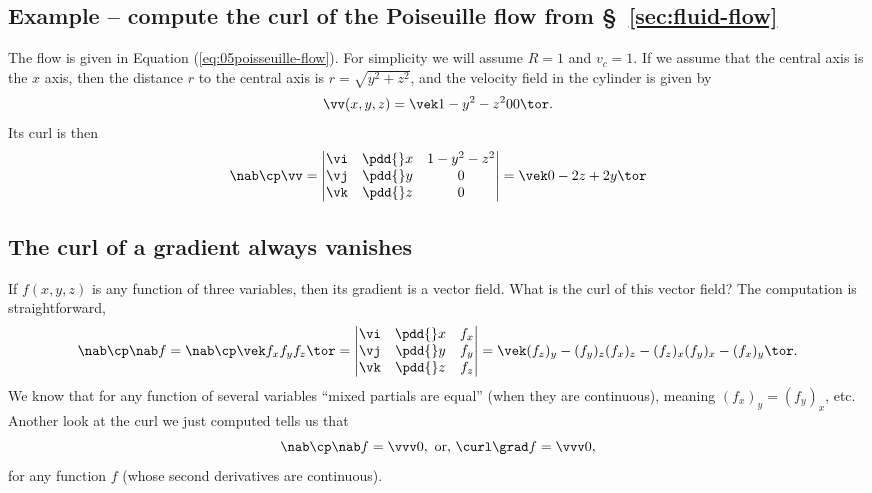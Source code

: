 \subsection{Example -- compute the curl of the Poiseuille flow from  
  \S~\ref{sec:fluid-flow}}
The flow is given in Equation (\ref{eq:05poisseuille-flow}).   For
simplicity we will assume $R=1$ and $v_c=1$.   If we assume that the central
axis is the $x$ axis, then the distance $r$ to the central axis is
$r=\sqrt{y^2+z^2}$, and the velocity field in the cylinder is given by
\[
\vv(x, y, z) = \vek 1-y^2 - z^2 \\0 \\0 \tor.
\]
Its curl is then
\[
\nab\cp\vv
=
\left|
  \begin{matrix}
    \vi & \pdd{}x &  1-y^2 - z^2 \\
    \vj & \pdd{}y & 0 \\
    \vk & \pdd{}z & 0
  \end{matrix}
\right|
=
\vek 0 \\ -2z \\ +2y \tor
\]

\subsection{The curl of a gradient always vanishes}  
\label{sec:curl-of-grad-is-zero}
If $f(x, y, z)$ is any function of three variables, then its gradient is a
vector field.   What is the curl of this vector field?  The computation is
straightforward,
\begin{equation}
  \nab\cp\nab f
  =
  \nab\cp \vek f_x\\ f_y\\ f_z\tor
  =\left|
    \begin{matrix}
      \vi & \pdd{}x &  f_x \\
      \vj & \pdd{}y &  f_y \\
      \vk & \pdd{}z & f_z
    \end{matrix}
  \right|
  =\vek (f_z)_y - (f_y)_z\\(f_x)_z - (f_z)_x \\ (f_y)_x - (f_x)_y\tor.
  \label{eq:05compute-curl-of-grad}
\end{equation}
We know that for any function of several variables ``mixed partials are
equal'' (when they are continuous), meaning $(f_x)_y = (f_y)_x$, etc.
Another look at the curl we just computed tells us that
\begin{equation}
  \label{eq:curl-of-grad-is-zero}
  \nab\cp\nab f = \vvv0, \text{ or, }
  \curl\grad f = \vvv0,
\end{equation}
for any function $f$ (whose second derivatives are continuous).

